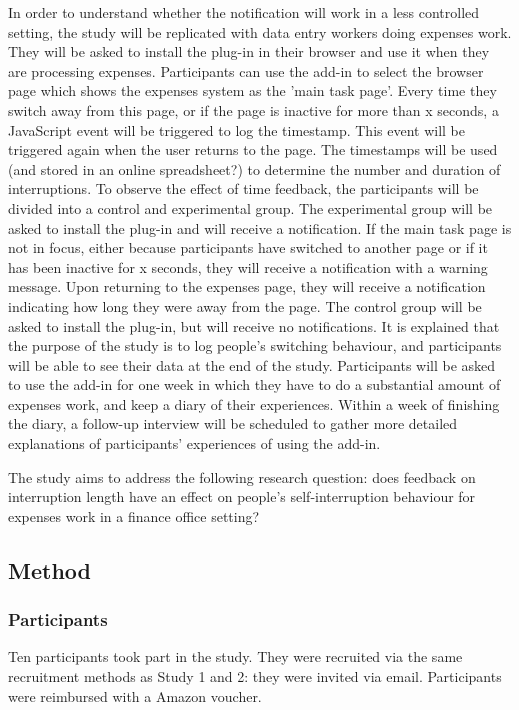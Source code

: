 In order to understand whether the notification will work in a less controlled setting, the study will be replicated with data entry workers doing expenses work. They will be asked to install the plug-in in their browser and use it when they are processing expenses. Participants can use the add-in to select the browser page which shows the expenses system as the 'main task page'. Every time they switch away from this page, or if the page is inactive for more than x seconds, a JavaScript event will be triggered to log the timestamp. This event will be triggered again when the user returns to the page. The timestamps will be used (and stored in an online spreadsheet?) to determine the number and duration of interruptions.
To observe the effect of time feedback, the participants will be divided into a control and experimental group. 
The experimental group will be asked to install the plug-in and will receive a notification. If the main task page is not in focus, either because participants have switched to another page or if it has been inactive for x seconds, they will receive a notification with a warning message. Upon returning to the expenses page, they will receive a notification indicating how long they were away from the page. The control group will be asked to install the plug-in, but will receive no notifications. It is explained that the purpose of the study is to log people's switching behaviour, and participants will be able to see their data at the end of the study.
Participants will be asked to use the add-in for one week in which they have to do a substantial amount of expenses work, and keep a diary of their experiences. Within a week of finishing the diary, a follow-up interview will be scheduled to gather more detailed explanations of participants' experiences of using the add-in.

The study aims to address the following research question: does feedback on interruption length have an effect on people's self-interruption behaviour for expenses work in a finance office setting? 

\subsection{Method}
\subsubsection{Participants}
Ten participants took part in the study. They were recruited via the same recruitment methods as Study 1 and 2: they were invited via email.
Participants were reimbursed with a  Amazon voucher.

